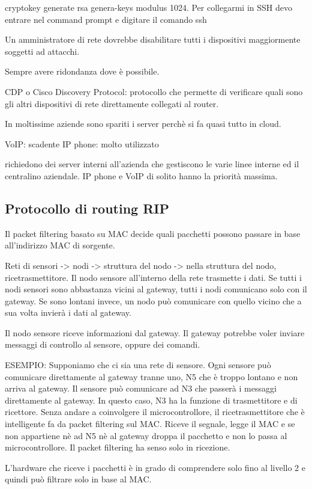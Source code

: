 \documentclass{article}
\begin{document}
    cryptokey generate rsa genera-keys modulus 1024.
    Per collegarmi in SSH devo entrare nel command prompt e digitare il comando ssh

    Un amministratore di rete dovrebbe disabilitare tutti i dispositivi maggiormente soggetti ad attacchi.

    Sempre avere ridondanza dove è possibile.

    CDP o Cisco Discovery Protocol: protocollo che permette di verificare quali sono gli altri dispositivi di rete direttamente collegati al router.

    In moltissime aziende sono spariti i server perchè si fa quasi tutto in cloud.
    
    VoIP: scadente
    IP phone: molto utilizzato

    richiedono dei server interni all'azienda che gestiscono le varie linee interne ed il centralino aziendale. IP phone e VoIP di solito hanno la priorità massima.

    \subsection{Protocollo di routing RIP}
    Il packet filtering basato su MAC decide quali pacchetti possono passare in base all'indirizzo MAC di sorgente.

    Reti di sensori -> nodi -> struttura del nodo -> nella struttura del nodo, ricetrasmettitore.
    Il nodo sensore all'interno della rete trasmette i dati. Se tutti i nodi sensori sono abbastanza vicini al gateway, tutti i nodi comunicano solo con il gateway. Se sono lontani invece, un nodo può comunicare con quello vicino che a sua volta invierà i dati al gateway.

    Il nodo sensore riceve informazioni dal gateway. Il gateway potrebbe voler inviare messaggi di controllo al sensore, oppure dei comandi.

    ESEMPIO:
    Supponiamo che ci sia una rete di sensore. Ogni sensore può comunicare direttamente al gateway tranne uno, N5 che è troppo lontano e non arriva al gateway. Il sensore può comunicare ad N3 che passerà i messaggi direttamente al gateway. In questo caso, N3 ha la funzione di trasmettitore e di ricettore. Senza andare a coinvolgere il microcontrollore, il ricetrasmettitore che è intelligente fa da packet filtering sul MAC. Riceve il segnale, legge il MAC e se non appartiene nè ad N5 nè al gateway droppa il pacchetto e non lo passa al microcontrollore. Il packet filtering ha senso solo in ricezione.

    L'hardware che riceve i pacchetti è in grado di comprendere solo fino al livello 2 e quindi può filtrare solo in base al MAC.
\end{document}
